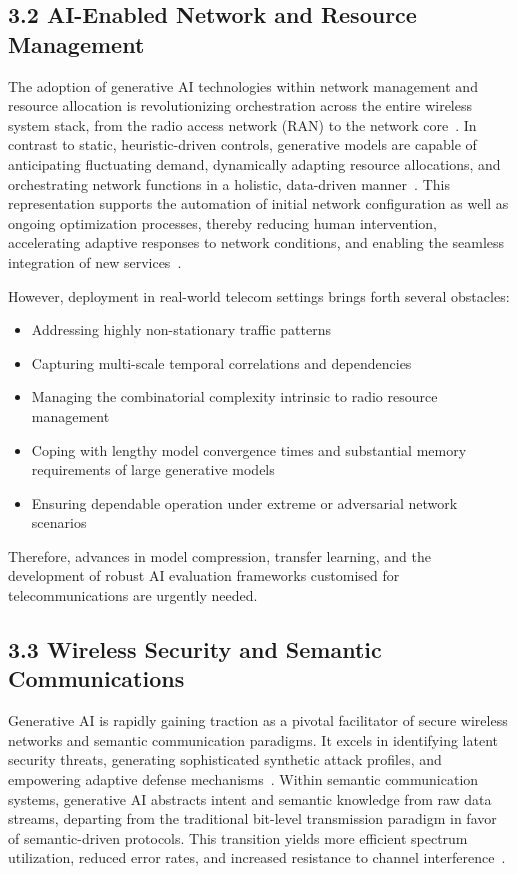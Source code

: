 \documentclass[11pt]{article}
\begin{document}
\subsection{3.2 AI-Enabled Network and Resource Management}

The adoption of generative AI technologies within network management and resource allocation is revolutionizing orchestration across the entire wireless system stack, from the radio access network (RAN) to the network core~\cite{ref44}. In contrast to static, heuristic-driven controls, generative models are capable of anticipating fluctuating demand, dynamically adapting resource allocations, and orchestrating network functions in a holistic, data-driven manner~\cite{ref44, ref46}. This representation supports the automation of initial network configuration as well as ongoing optimization processes, thereby reducing human intervention, accelerating adaptive responses to network conditions, and enabling the seamless integration of new services~\cite{ref46}.

However, deployment in real-world telecom settings brings forth several obstacles:
\begin{itemize}
    \item Addressing highly non-stationary traffic patterns
    \item Capturing multi-scale temporal correlations and dependencies
    \item Managing the combinatorial complexity intrinsic to radio resource management
    \item Coping with lengthy model convergence times and substantial memory requirements of large generative models
    \item Ensuring dependable operation under extreme or adversarial network scenarios
\end{itemize}
Therefore, advances in model compression, transfer learning, and the development of robust AI evaluation frameworks customised for telecommunications are urgently needed.

\subsection{3.3 Wireless Security and Semantic Communications}

Generative AI is rapidly gaining traction as a pivotal facilitator of secure wireless networks and semantic communication paradigms. It excels in identifying latent security threats, generating sophisticated synthetic attack profiles, and empowering adaptive defense mechanisms~\cite{ref15, ref26, ref44}. Within semantic communication systems, generative AI abstracts intent and semantic knowledge from raw data streams, departing from the traditional bit-level transmission paradigm in favor of semantic-driven protocols. This transition yields more efficient spectrum utilization, reduced error rates, and increased resistance to channel interference~\cite{ref15, ref26, ref44}.
\end{document}
